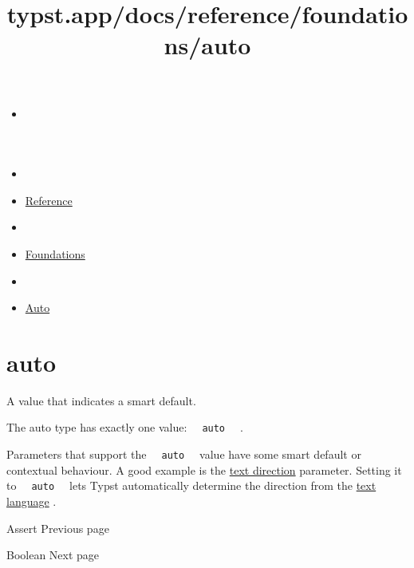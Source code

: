 \title{typst.app/docs/reference/foundations/auto}

\begin{itemize}
\tightlist
\item
  \href{/docs}{}
\item
  
\item
  \href{/docs/reference/}{Reference}
\item
  
\item
  \href{/docs/reference/foundations/}{Foundations}
\item
  
\item
  \href{/docs/reference/foundations/auto/}{Auto}
\end{itemize}

\section{\texorpdfstring{{ auto }}{ auto }}\label{summary}

A value that indicates a smart default.

The auto type has exactly one value:
\texttt{\ }{\texttt{\ auto\ }}\texttt{\ } .

Parameters that support the \texttt{\ }{\texttt{\ auto\ }}\texttt{\ }
value have some smart default or contextual behaviour. A good example is
the \href{/docs/reference/text/text/\#parameters-dir}{text direction}
parameter. Setting it to \texttt{\ }{\texttt{\ auto\ }}\texttt{\ } lets
Typst automatically determine the direction from the
\href{/docs/reference/text/text/\#parameters-lang}{text language} .

\href{/docs/reference/foundations/assert/}{\pandocbounded{}}

{ Assert } { Previous page }

\href{/docs/reference/foundations/bool/}{\pandocbounded{}}

{ Boolean } { Next page }
